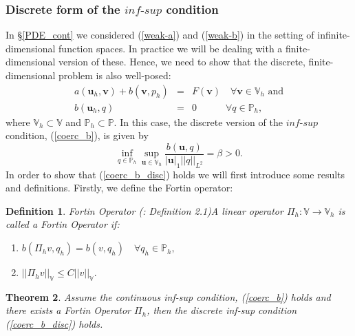 \documentclass[12pt,a4paper]{article}
\newtheorem{theorem}{Theorem}[section]
\newtheorem{definition}[theorem]{Definition}
\theoremstyle{definition}
\begin{document}
\subsubsection{Discrete form of the $\textit{inf-sup}$ condition}\label{PDE_disc}
In \S \ref{PDE_cont} we considered (\ref{weak-a}) and (\ref{weak-b}) in the setting of infinite-dimensional function spaces.  In practice we will be dealing with a finite-dimensional version of these.  Hence, we need to show that the discrete, finite-dimensional problem is also well-posed:
\begin{eqnarray}
		a\left(\textbf{u}_h,\textbf{v}\right) + b\left(\textbf{v},p_h\right) &=& F\left(\textbf{v}\right)\quad \forall 
	\textbf{v} \in \mathbb{V}_h \text{ and} \\
	b\left(\textbf{u}_h,q\right)&=&0 \quad \quad\quad\forall q \in\mathbb{P}_h,
\end{eqnarray}
where $\mathbb{V}_h\subset\mathbb{V}$ and $\mathbb{P}_h\subset\mathbb{P}$.  In this case, the discrete version of the $\textit{inf-sup}$ condition, (\ref{coerc_b}), is given by
\begin{equation}\label{coerc_b_disc}
	\inf_{q\in \mathbb{P}_h}\sup_{\textbf{u}\in \mathbb{V}_h}\frac{b\left(\textbf{u},q\right)}{\left|\textbf{u}\right|_1 \left|\left|q\right|\right|_{L^2}}=\beta>0.
\end{equation}
In order to show that (\ref{coerc_b_disc}) holds we will first introduce some results and definitions. Firstly, we define the Fortin operator:
\theoremstyle{definition}
\begin{definition}{Fortin Operator} (\cite{Chen2016}: Definition 2.1)\label{Fortin_defn}
	A linear operator $\Pi_h: \mathbb{V} \rightarrow \mathbb{V}_h$ is called a Fortin Operator if:
	\begin{enumerate}
	\item$b\left(\Pi_h v, q_h\right)=b\left(v, q_h\right)\quad \forall q_h \in \mathbb{P}_h,$
	\item $\left|\left|\Pi_h v\right|\right|_{\mathbb{V}}\leq C\left|\left|v\right|\right|_\mathbb{V}.$
	\end{enumerate}
\end{definition}
\begin{theorem}\label{theorem_inf_sup_disc}
	Assume the continuous inf-sup condition, (\ref{coerc_b}) holds and there exists a Fortin Operator $\Pi_h$, then the discrete inf-sup condition (\ref{coerc_b_disc}) holds.
\end{theorem}
\end{document}
